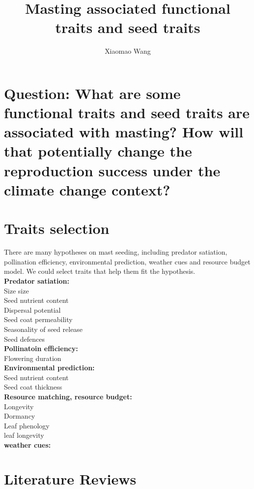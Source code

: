 \documentclass{article}
\begin{document}
\title{Masting associated functional traits and seed traits}
\author{Xiaomao Wang}

\maketitle

\section*{Question: What are some functional traits and seed traits are associated with masting? How will that potentially change the reproduction success under the climate change context?}

\section{Traits selection}

There are many hypotheses on mast seeding, including predator satiation, pollination efficiency, environmental prediction, weather cues and resource budget model. We could select traits that help them fit the hypothesis.\\
\textbf{Predator satiation: }\\
	{Size size}\\
	{Seed nutrient content}\\
	{Dispersal potential}\\
	{Seed coat permeability}\\
	{Seasonality of seed release}\\
	{Seed defences}\\
\textbf{Pollinatoin efficiency: }\\
	{Flowering duration}\\
\textbf{Environmental prediction: }\\
	{Seed nutrient content}\\
	{Seed coat thickness}\\
\textbf{Resource matching, resource budget: }\\
	{Longevity}\\
	{Dormancy}\\
	{Leaf phenology}\\
	{leaf longevity}\\
\textbf{weather cues: }\\

\section{Literature Reviews}
\end{document}
